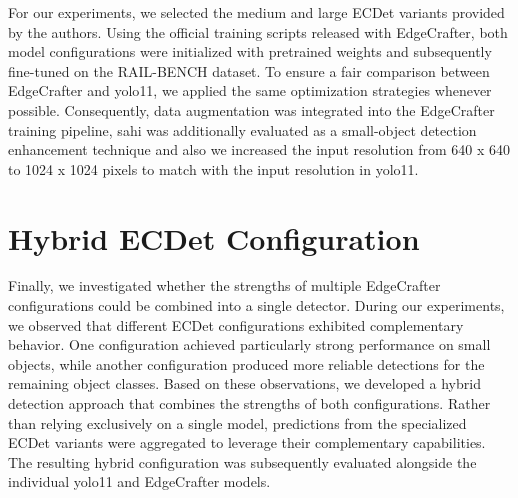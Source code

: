 For our experiments, we selected the medium and large ECDet variants provided by the authors. Using the official training scripts released with EdgeCrafter, both model configurations were initialized with pretrained weights and subsequently fine-tuned on the RAIL-BENCH dataset. To ensure a fair comparison between EdgeCrafter and \acrshort{yolo}11, we applied the same optimization strategies whenever possible. Consequently, data augmentation was integrated into the EdgeCrafter training pipeline, \acrshort{sahi} was additionally evaluated as a small-object detection enhancement technique and also we increased the input resolution from 640 x 640 to 1024 x 1024 pixels to match with the input resolution in \acrshort{yolo}11.


\section{Hybrid ECDet Configuration}

Finally, we investigated whether the strengths of multiple EdgeCrafter configurations could be combined into a single detector. 
During our experiments, we observed that different ECDet configurations exhibited complementary behavior. 
One configuration achieved particularly strong performance on small objects, while another configuration produced more reliable detections for the remaining object classes. Based on these observations, we developed a hybrid detection approach that combines the strengths of both configurations. Rather than relying exclusively on a single model, predictions from the specialized ECDet variants were aggregated to leverage their complementary capabilities. The resulting hybrid configuration was subsequently evaluated alongside the individual \acrshort{yolo}11 and EdgeCrafter models.